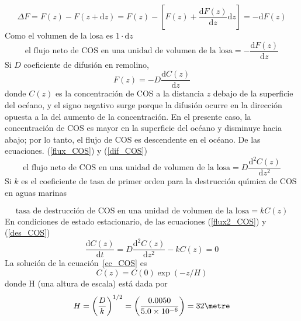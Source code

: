 \begin{example}
\begin{equation}
\Delta F=F(z)-F(z+\mathrm{d}z)=F(z)-\left[ F(z)+\frac{\mathrm{d}F(z)}{\mathrm{d}z}\mathrm{d}z \right]=-\mathrm{d}F(z)
\end{equation}
Como el volumen de la losa es $1\cdot \mathrm{d}z$ 
\begin{equation}
\textrm{el flujo neto de COS en una unidad de volumen de la losa} =-\frac{\mathrm{d}F(z)}{\mathrm{d}z}
\label{flux_COS}
\end{equation}
Si $D$ coeficiente de difusi\'on en remolino,
\begin{equation}
F(z)=-D\frac{\mathrm{d}C(z)}{\mathrm{d}z}
\label{dif_COS}
\end{equation}
donde $C(z)$ es la concentraci\'on de COS a la distancia $z$ debajo de la superficie del oc\'eano, y el signo negativo surge porque la difusi\'on ocurre en la direcci\'on opuesta a la del aumento de la concentraci\'on. En el presente caso, la concentraci\'on de COS es mayor en la superficie del oc\'eano y disminuye hacia abajo; por lo tanto, el flujo de COS es descendente en el oc\'eano. De las ecuaciones. (\ref{flux_COS}) y (\ref{dif_COS})
\begin{equation}
\textrm{el flujo neto de COS en una unidad de volumen de la losa} =D\frac{\mathrm{d}^2C(z)}{\mathrm{d}z^2}
\label{flux2_COS}
\end{equation}
\noindent Si $k$ es el coeficiente de tasa de primer orden para la destrucci\'on qu\'{\i}mica de COS en aguas marinas 

\begin{equation}
\textrm{tasa de destrucci\'on de COS en una unidad de volumen de la losa} =kC(z)
\label{des_COS}
\end{equation}
\noindent En condiciones de estado estacionario, de las ecuaciones (\ref{flux2_COS}) y  (\ref{des_COS})
\begin{equation}
\frac{\mathrm{d}C(z)}{\mathrm{d}t}=D\frac{\mathrm{d}^2C(z)}{\mathrm{d}z^2}-kC(z)=0
\label{cc_COS}
\end{equation}
La soluci\'on de la ecuaci\'on~\ref{cc_COS} es
\begin{equation}
C(z)=C(0)\exp(-z/H)
\label{c_cos}
\end{equation}
\noindent donde H (una altura de escala) est\'a dada por
\begin{equation}
H=\left( \frac{D}{k}\right)^{1/2} =  \left( \frac{0.0050}{5.0\times10^{-6}}\right)=32 \metre
\label{H_COS}
\end{equation}


\end{example}
